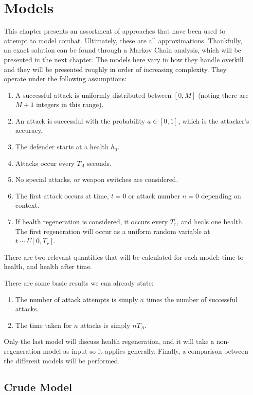 \chapter{Models}
	This chapter presents an assortment of approaches that have been used to attempt to model combat. Ultimately, these are all approximations. Thankfully, an exact solution can be found through a Markov Chain analysis, which will be presented in the next chapter. The models here vary in how they handle overkill and they will be presented roughly in order of increasing complexity. They operate under the following assumptions:
	\begin{enumerate}
		\item A successful attack is uniformly distributed between $[0, M]$ (noting there are $M+1$ integers in this range).
		\item An attack is successful with the probability $a\in[0, 1]$, which is the attacker's accuracy.
		\item The defender starts at a health $h_0$.
		\item Attacks occur every $T_A$ seconds.
		\item No special attacks, or weapon switches are considered.
		\item The first attack occurs at time, $t=0$ or attack number $n=0$ depending on context.
		\item If health regeneration is considered, it occurs every $T_r$, and heals one health.
				The first regeneration will occur as a uniform random variable at $t\sim U[0, T_r]$.
	\end{enumerate}
	There are two relevant quantities that will be calculated for each model: time to health, and health after time.

	There are some basic results we can already state:
	\begin{enumerate}
		\item The number of attack attempts is simply $a$ times the number of successful attacks.
		\item The time taken for $n$ attacks is simply $nT_A$.
	\end{enumerate}



	Only the last model will discuss health regeneration, and it will take a non-regeneration model as input so it applies generally.
	Finally, a comparison between the different models will be performed.


	\section{Crude Model}

